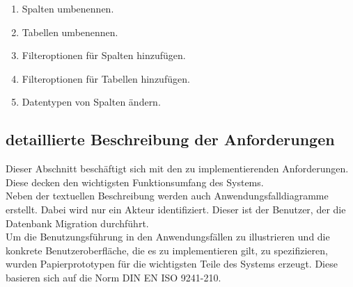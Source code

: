 \begin{enumerate}
	\item Spalten  umbenennen.
	\item Tabellen umbenennen.
	\item Filteroptionen für Spalten hinzufügen.
	\item Filteroptionen für Tabellen hinzufügen.
	\item Datentypen von Spalten ändern.
\end{enumerate}




\subsection{detaillierte Beschreibung der Anforderungen}
Dieser Abschnitt beschäftigt sich mit den zu implementierenden Anforderungen. Diese decken den wichtigsten Funktionsumfang des Systems.\\
Neben der textuellen Beschreibung werden auch Anwendungsfalldiagramme erstellt. Dabei wird nur ein Akteur identifiziert. Dieser ist der Benutzer, der die Datenbank Migration durchführt. \\
Um die Benutzungsführung in den Anwendungsfällen zu illustrieren und die konkrete Benutzeroberfläche, die es zu implementieren gilt, zu spezifizieren, wurden Papierprototypen für die wichtigsten Teile des Systems erzeugt. Diese basieren sich auf die Norm DIN EN ISO 9241-210.


